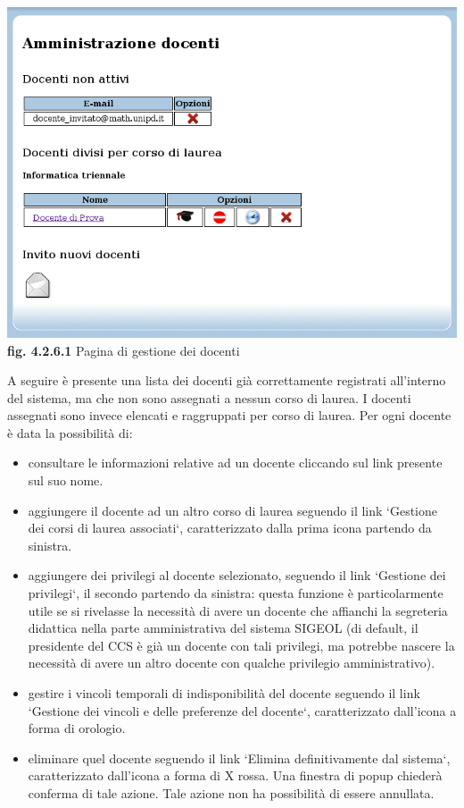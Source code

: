 \documentclass[11pt,a4paper]{article}
\begin{document}
\bigskip
\begin{center}
	\includegraphics[scale=0.5]{images/amministrazione_docenti.jpg}\\
	\textbf{fig. 4.2.6.1} Pagina di gestione dei docenti\\
\end{center}
\bigskip

A seguire è presente una lista dei docenti già correttamente registrati all'interno del sistema, ma che non sono assegnati a nessun corso di laurea.
I docenti assegnati sono invece elencati e raggruppati per corso di laurea.
Per ogni docente è data la possibilità di:
\begin{itemize}
 \item consultare le informazioni relative ad un docente cliccando sul link presente sul suo nome.
 \item aggiungere il docente ad un altro corso di laurea seguendo il link `Gestione dei corsi di laurea associati`, caratterizzato dalla prima icona partendo da sinistra.
 \item aggiungere dei privilegi al docente selezionato, seguendo il link `Gestione dei privilegi`, il secondo partendo da sinistra: questa funzione è particolarmente utile se si rivelasse la necessità di avere un docente che affianchi la segreteria didattica nella parte amministrativa del sistema SIGEOL (di default, il presidente del CCS è già un docente con tali privilegi, ma potrebbe nascere la necessità di avere un altro docente con qualche privilegio amministrativo).
 \item gestire i vincoli temporali di indisponibilità del docente seguendo il link `Gestione dei vincoli e delle preferenze del docente`, caratterizzato dall'icona a forma di orologio.
 \item eliminare quel docente seguendo il link `Elimina definitivamente dal sistema`, caratterizzato dall'icona a forma di X rossa. Una finestra di popup chiederà conferma di tale azione. Tale azione non ha possibilità di essere annullata.
\end{itemize}
\end{document}
